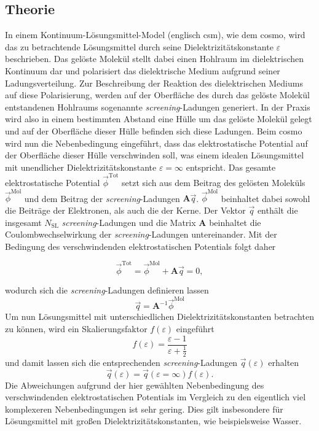 	\subsection{Theorie}
	In einem Kontinuum-Lösungsmittel-Model (englisch \ac{csm}), wie dem \ac{cosmo}, wird das zu betrachtende Lösungsmittel durch seine Dielektrizitätskonstante $\varepsilon$ beschrieben. Das gelöste Molekül stellt dabei einen Hohlraum im dielektrischen Kontinuum dar und polarisiert das dielektrische Medium aufgrund seiner Ladungsverteilung. Zur Beschreibung der Reaktion des dielektrischen Mediums auf diese Polarisierung, werden auf der Oberfläche des durch das gelöste Molekül entstandenen Hohlraums sogenannte \textit{screening}-Ladungen generiert. In der Praxis wird also in einem bestimmten Abstand eine Hülle um das gelöste Molekül gelegt und auf der Oberfläche dieser Hülle befinden sich diese Ladungen. Beim \ac{cosmo} wird nun die Nebenbedingung eingeführt, dass das elektrostatische Potential auf der Oberfläche dieser Hülle verschwinden soll, was einem idealen Lösungsmittel mit unendlicher Dielektrizitätskonstante $\varepsilon=\infty$ entspricht. Das gesamte elektrostatische Potential $\vec{\phi}^{\textrm{Tot}}$ setzt sich aus dem Beitrag des gelösten Moleküls $\vec{\phi}^{\textrm{Mol}}$ und dem Beitrag der \textit{screening}-Ladungen $\boldsymbol{A}\vec{q}$. $\vec{\phi}^{\textrm{Mol}}$ beinhaltet dabei sowohl die Beiträge der Elektronen, als auch die der Kerne. Der Vektor $\vec{q}$ enthält die insgesamt $N_{\textrm{SL}}$ \textit{screening}-Ladungen und die Matrix $\boldsymbol{A}$ beinhaltet die Coulombwechselwirkung der \textit{screening}-Ladungen untereinander. Mit der Bedingung des verschwindenden elektrostatischen Potentials folgt daher
	
	\begin{equation}
	\vec{\phi}^{\textrm{Tot}}=\vec{\phi}^{\textrm{Mol}}+\boldsymbol{A}\vec{q}=0,
	\end{equation}
	
wodurch sich die \textit{screening}-Ladungen definieren lassen
	\begin{equation}
	\vec{q}=\boldsymbol{A}^{-1}\vec{\phi}^{\textrm{Mol}}
	\end{equation}
Um nun Lösungsmittel mit unterschiedlichen Dielektrizitätskonstanten betrachten zu können, wird ein Skalierungsfaktor $f(\varepsilon)$ eingeführt
	\begin{equation}
	f(\varepsilon)=\frac{\varepsilon-1}{\varepsilon+\frac{1}{2}}
	\end{equation}
und damit lassen sich die entsprechenden \textit{screening}-Ladungen $\vec{q}(\varepsilon)$ erhalten
	\begin{equation}
	\vec{q}(\varepsilon)=\vec{q}(\varepsilon=\infty)f(\varepsilon).
	\end{equation}
Die Abweichungen aufgrund der hier gewählten Nebenbedingung des verschwindenden elektrostatischen Potentials im Vergleich zu den eigentlich viel komplexeren Nebenbedingungen ist sehr gering.\supercite{klamt1993cosmo} Dies gilt insbesondere für Lösungsmittel mit großen Dielektrizitätskonstanten, wie beispielsweise Wasser.

